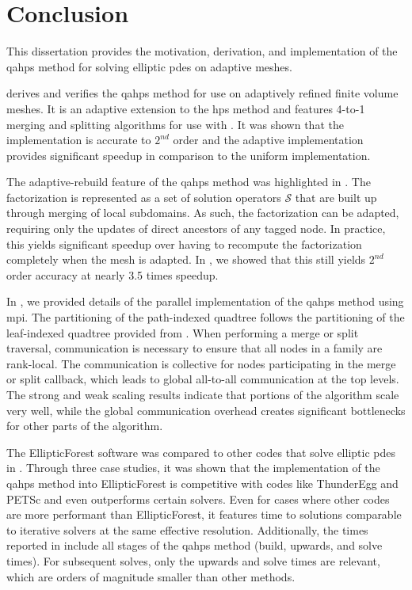 \section{Conclusion}
\label{sec:conclusion}

This dissertation provides the motivation, derivation, and implementation of the \gls{qahps} method for solving elliptic \gls{pdes} on adaptive meshes.

 derives and verifies the \gls{qahps} method for use on adaptively refined finite volume meshes. It is an adaptive extension to the \gls{hps} method \citep{gillman2014direct} and features 4-to-1 merging and splitting algorithms for use with \pforest \citep{burstedde2011p4est}. It was shown that the implementation is accurate to $2^{nd}$ order and the adaptive implementation provides significant speedup in comparison to the uniform implementation.

The adaptive-rebuild feature of the \gls{qahps} method was highlighted in . The factorization is represented as a set of solution operators $\mathcal{S}$ that are built up through merging of local subdomains. As such, the factorization can be adapted, requiring only the updates of direct ancestors of any tagged node. In practice, this yields significant speedup over having to recompute the factorization completely when the mesh is adapted. In , we showed that this still yields $2^{nd}$ order accuracy at nearly 3.5 times speedup.

In , we provided details of the parallel implementation of the \gls{qahps} method using \gls{mpi}. The partitioning of the path-indexed quadtree follows the partitioning of the leaf-indexed quadtree provided from \pforest. When performing a merge or split traversal, communication is necessary to ensure that all nodes in a family are rank-local. The communication is collective for nodes participating in the merge or split callback, which leads to global all-to-all communication at the top levels. The strong and weak scaling results indicate that portions of the algorithm scale very well, while the global communication overhead creates significant bottlenecks for other parts of the algorithm.

The EllipticForest software was compared to other codes that solve elliptic \gls{pdes} in . Through three case studies, it was shown that the implementation of the \gls{qahps} method into EllipticForest is competitive with codes like ThunderEgg and PETSc and even outperforms certain solvers. Even for cases where other codes are more performant than EllipticForest, it features time to solutions comparable to iterative solvers at the same effective resolution. Additionally, the times reported in  include all stages of the \gls{qahps} method (build, upwards, and solve times). For subsequent solves, only the upwards and solve times are relevant, which are orders of magnitude smaller than other methods.